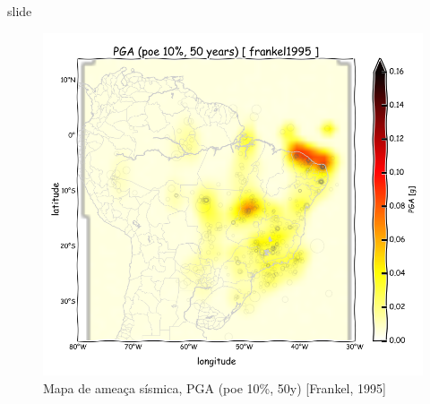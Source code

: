 \documentclass[ucs,8pt]{beamer}
\begin{document}
\begin{frame}{slide}

\begin{figure}[H]
  \centering
  \includegraphics[height=.80\textheight]{pga_frankel} 
  \caption{Mapa de ameaça sísmica, PGA (poe 10\%, 50y) [Frankel, 1995] }
  \label{fig:pga_fran} 
\end{figure}

\end{frame}
\end{document}
